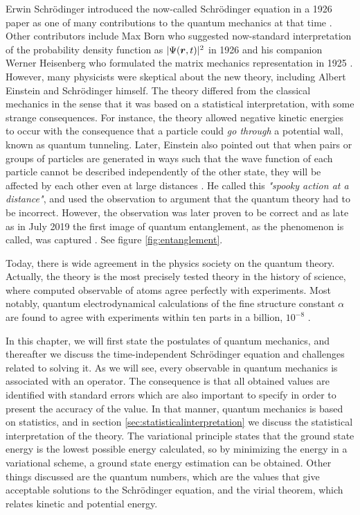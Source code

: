 Erwin Schrödinger introduced the now-called Schrödinger equation in a 1926 paper as one of many contributions to the quantum mechanics at that time \cite{schrodinger_undulatory_1926}. Other contributors include Max Born who suggested now-standard interpretation of the probability density function as $|\Psi(\boldsymbol{{r}},t)|^2$ in 1926 \cite{born_zur_1926} and his companion Werner Heisenberg who formulated the matrix mechanics representation in 1925 \cite{heisenberg_uber_1925}. However, many physicists were skeptical about the new theory, including Albert Einstein and Schrödinger himself. The theory differed from the classical mechanics in the sense that it was based on a statistical interpretation, with some strange consequences. For instance, the theory allowed negative kinetic energies to occur with the consequence that a particle could \textit{go through} a potential wall, known as quantum tunneling. Later, Einstein also pointed out that when pairs or groups of particles are generated in ways such that the wave function of each particle cannot be described independently of the other state, they will be affected by each other even at large distances \cite{einstein_can_1935}. He called this \textit{"spooky action at a distance"}, and used the observation to argument that the quantum theory had to be incorrect. However, the observation was later proven to be correct and as late as in July 2019 the first image of quantum entanglement, as the phenomenon is called, was captured \cite{moreau_imaging_2019}. See figure \eqref{fig:entanglement}.

Today, there is wide agreement in the physics society on the quantum theory. Actually, the theory is the most precisely tested theory in the history of science, where computed observable of atoms agree perfectly with experiments. Most notably, quantum electrodynamical calculations of the fine structure constant $\alpha$ are found to agree with experiments within ten parts in a billion, $10^{-8}$ \cite{noauthor_most_nodate}.\bigskip

In this chapter, we will first state the postulates of quantum mechanics, and thereafter we discuss the time-independent Schrödinger equation and challenges related to solving it. As we will see, every observable in quantum mechanics is associated with an operator. The consequence is that all obtained values are identified with standard errors which are also important to specify in order to present the accuracy of the value. In that manner, quantum mechanics is based on statistics, and in section \eqref{sec:statisticalinterpretation} we discuss the statistical interpretation of the theory. The variational principle states that the ground state energy is the lowest possible energy calculated, so by minimizing the energy in a variational scheme, a ground state energy estimation can be obtained. Other things discussed are the quantum numbers, which are the values that give acceptable solutions to the Schrödinger equation, and the virial theorem, which relates kinetic and potential energy. 

